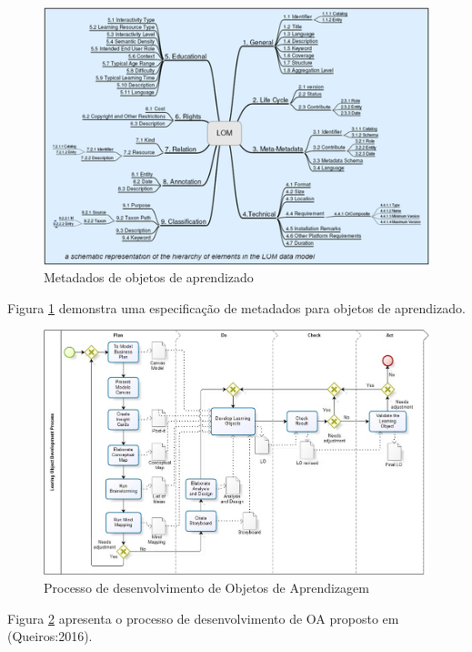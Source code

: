 \documentclass[12pt,openright,oneside,a4paper,english,french,spanish,brazil]{unifil}
\begin{document}
\begin{figure}[htb]
	\centering
	\includegraphics[scale=1.0]{images/lom.png}
	\caption{Metadados de objetos de aprendizado}
	\label{img:lom}
\end{figure}
Figura \ref{img:lom} demonstra uma especificação de metadados para objetos de aprendizado.

\begin{figure}[htb]
	\centering
	\includegraphics[scale=0.2]{images/LODPRO.png}
	\caption{Processo de desenvolvimento de Objetos de Aprendizagem}
	\label{img:lodpro}
\end{figure}
Figura \ref{img:lodpro} apresenta o processo de desenvolvimento de OA proposto em (Queiros:2016).
\end{document}

